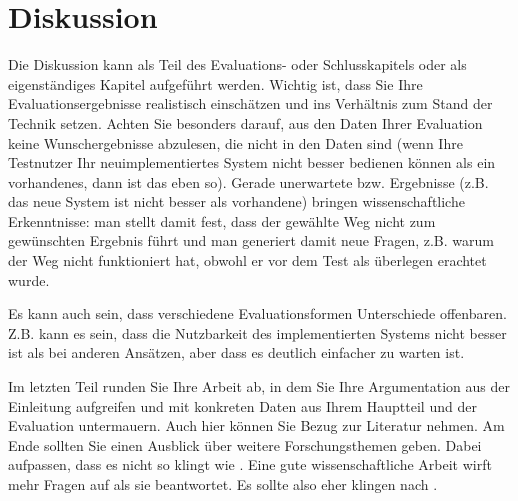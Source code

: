 
\chapter{Diskussion}
Die Diskussion kann als Teil des Evaluations- oder Schlusskapitels oder als eigenständiges Kapitel aufgeführt werden. Wichtig ist, dass Sie Ihre Evaluationsergebnisse realistisch einschätzen und ins Verhältnis zum Stand der Technik setzen. Achten Sie besonders darauf, aus den Daten Ihrer Evaluation keine Wunschergebnisse abzulesen, die nicht in den Daten sind (wenn Ihre Testnutzer Ihr neuimplementiertes System nicht besser bedienen können als ein vorhandenes, dann ist das eben so). Gerade unerwartete bzw.  Ergebnisse (z.B. das neue System ist nicht besser als vorhandene) bringen wissenschaftliche Erkenntnisse: man stellt damit fest, dass der gewählte Weg nicht zum gewünschten Ergebnis führt und man generiert damit neue Fragen, z.B. warum der Weg nicht funktioniert hat, obwohl er vor dem Test als überlegen erachtet wurde.

Es kann auch sein, dass verschiedene Evaluationsformen Unterschiede offenbaren. Z.B. kann es sein, dass die Nutzbarkeit des implementierten Systems nicht besser ist als bei anderen Ansätzen, aber dass es deutlich einfacher zu warten ist.


Im letzten Teil runden Sie Ihre Arbeit ab, in dem Sie Ihre Argumentation aus der Einleitung aufgreifen und mit konkreten Daten aus Ihrem Hauptteil und der Evaluation untermauern. Auch hier können Sie Bezug zur Literatur nehmen. Am Ende sollten Sie einen Ausblick über weitere Forschungsthemen geben. Dabei aufpassen, dass es nicht so klingt wie . Eine gute wissenschaftliche Arbeit wirft mehr Fragen auf als sie beantwortet. Es sollte also eher klingen nach .